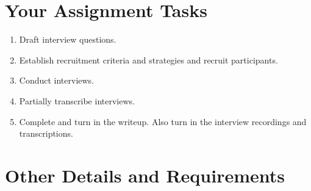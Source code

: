 \documentclass{article}
\begin{document}
\section{Your Assignment Tasks}
\begin{enumerate}
    \item Draft interview questions.
    \item Establish recruitment criteria and strategies and recruit participants.
    \item Conduct interviews.
    \item Partially transcribe interviews.
    \item Complete and turn in the writeup. Also turn in the interview recordings and transcriptions.
\end{enumerate}

\section{Other Details and Requirements}
\end{document}
